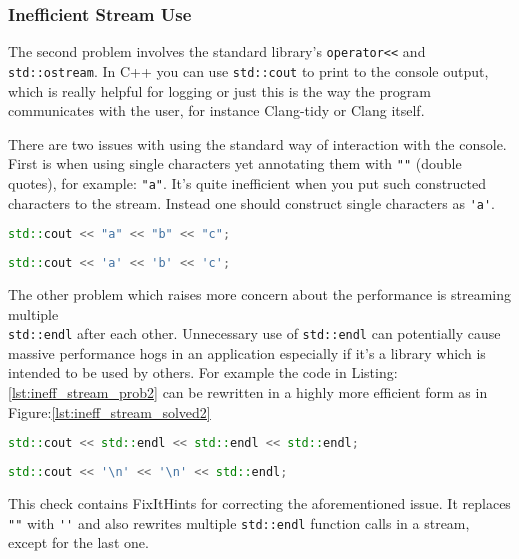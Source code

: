  \subsubsection{Inefficient Stream Use}
 \par The second problem involves the standard library's \verb|operator<<| and \verb|std::ostream|. In C++ you can use 
\verb|std::cout| to print to the console output, which is really helpful for logging or just this is the way the program communicates with the user, for instance Clang-tidy or Clang itself.\medskip
\par There are two issues with using the standard way of interaction with the console. First is when using single characters yet annotating them with \verb|""| (double quotes), for example: \verb|"a"|. It's quite inefficient when you put such constructed characters to the stream. Instead one should construct single characters as \verb|'a'|.\medskip \begin{lstlisting}[language=c++, frame=single ,caption={Sightly inefficient way of streaming characters}, label={lst:ineff_stream_pro}]
std::cout << "a" << "b" << "c";
\end{lstlisting}
\begin{lstlisting}[language=c++, frame=single ,caption={A generally more efficient version}, label={lst:ineff_stream_solved}]
std::cout << 'a' << 'b' << 'c';
\end{lstlisting}
\par The other problem which raises more concern about the performance is streaming multiple \\\verb|std::endl| after each other. Unnecessary use of \verb|std::endl| can potentially cause massive performance hogs in an application especially if it's a library which is intended to be used by others. For example the code in Listing:\ref{lst:ineff_stream_prob2} can be rewritten in a highly more efficient form as in Figure:\ref{lst:ineff_stream_solved2}
\begin{lstlisting}[language=c++, frame=single ,caption={A really slow way to print newlines}, label={lst:ineff_stream_prob2}]
std::cout << std::endl << std::endl << std::endl;
\end{lstlisting}
\begin{lstlisting}[language=c++, frame=single ,caption={A more efficient version}, label={lst:ineff_stream_solved2}]
std::cout << '\n' << '\n' << std::endl;
\end{lstlisting}
\par This check contains FixItHints for correcting the aforementioned issue. It replaces \verb|""| with \verb|''| and also rewrites multiple \verb|std::endl| function calls in a stream, except for the last one. 
